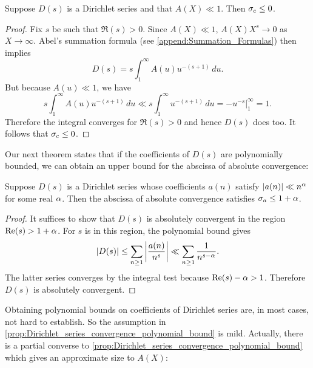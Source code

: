       \begin{proposition}\label{prop:Dirichlet_series_convergence_bounded_coefficient_sum}
        Suppose $D(s)$ is a Dirichlet series and that $A(X) \ll 1$. Then $\sigma_{c} \le 0$.
      \end{proposition}
      \begin{proof}
        Fix $s$ be such that $\Re(s) > 0$. Since $A(X) \ll 1$, $A(X)X^{s} \to 0$ as $X \to \infty$. Abel's summation formula (see \cref{append:Summation_Formulas}) then implies
        \[
          D(s) = s\int_{1}^{\infty}A(u)u^{-(s+1)}\,du.
        \]
        But because $A(u) \ll 1$, we have
        \[
          s\int_{1}^{\infty}A(u)u^{-(s+1)}\,du \ll s\int_{1}^{\infty}u^{-(s+1)}\,du = -u^{-s}\big|_{1}^{\infty} = 1.
        \]
        Therefore the integral converges for $\Re(s) > 0$ and hence $D(s)$ does too. It follows that $\sigma_{c} \le 0$.
      \end{proof}

      Our next theorem states that if the coefficients of $D(s)$ are polynomially bounded, we can obtain an upper bound for the abscissa of absolute convergence:

      \begin{proposition}\label{prop:Dirichlet_series_convergence_polynomial_bound}
        Suppose $D(s)$ is a Dirichlet series whose coefficients $a(n)$ satisfy $|a(n)| \ll n^{\alpha}$ for some real $\alpha$. Then the abscissa of absolute convergence satisfies $\sigma_{a} \le 1+\alpha$.
      \end{proposition}
      \begin{proof}
        It suffices to show that $D(s)$ is absolutely convergent in the region $\mathrm{Re}(s) > 1+\alpha$. For $s$ is in this region, the polynomial bound gives
        \[
          |D(s)| \le \sum_{n \ge 1}\left|\frac{a(n)}{n^{s}}\right| \ll \sum_{n \ge 1}\frac{1}{n^{s-\alpha}}.
        \]
        The latter series converges by the integral test because $\mathrm{Re}(s)-\alpha > 1$. Therefore $D(s)$ is absolutely convergent.
      \end{proof}

      Obtaining polynomial bounds on coefficients of Dirichlet series are, in most cases, not hard to establish. So the assumption in \cref{prop:Dirichlet_series_convergence_polynomial_bound} is mild. Actually, there is a partial converse to \cref{prop:Dirichlet_series_convergence_polynomial_bound} which gives an approximate size to $A(X)$:

